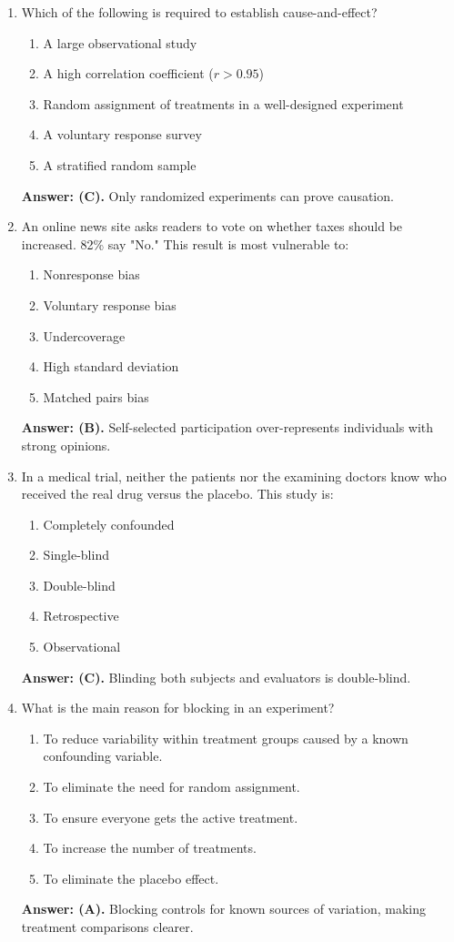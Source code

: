 \begin{enumerate}[leftmargin=1.5em]
  \item Which of the following is required to establish cause-and-effect?
  \begin{enumerate}[label=(\Alph*)]
    \item A large observational study \item A high correlation coefficient ($r > 0.95$) \item Random assignment of treatments in a well-designed experiment \item A voluntary response survey \item A stratified random sample
  \end{enumerate}
  \textbf{Answer: (C).} Only randomized experiments can prove causation.

  \item An online news site asks readers to vote on whether taxes should be increased. 82\% say "No." This result is most vulnerable to:
  \begin{enumerate}[label=(\Alph*)]
    \item Nonresponse bias \item Voluntary response bias \item Undercoverage \item High standard deviation \item Matched pairs bias
  \end{enumerate}
  \textbf{Answer: (B).} Self-selected participation over-represents individuals with strong opinions.

  \item In a medical trial, neither the patients nor the examining doctors know who received the real drug versus the placebo. This study is:
  \begin{enumerate}[label=(\Alph*)]
    \item Completely confounded \item Single-blind \item Double-blind \item Retrospective \item Observational
  \end{enumerate}
  \textbf{Answer: (C).} Blinding both subjects and evaluators is double-blind.

  \item What is the main reason for blocking in an experiment?
  \begin{enumerate}[label=(\Alph*)]
    \item To reduce variability within treatment groups caused by a known confounding variable.
    \item To eliminate the need for random assignment.
    \item To ensure everyone gets the active treatment.
    \item To increase the number of treatments.
    \item To eliminate the placebo effect.
  \end{enumerate}
  \textbf{Answer: (A).} Blocking controls for known sources of variation, making treatment comparisons clearer.


\end{enumerate}
